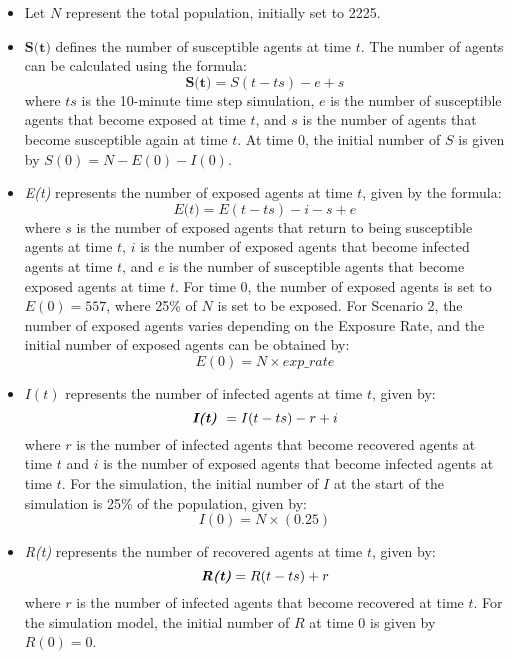  \begin{itemize}     
 	\item Let \( N \) represent the total population, initially set to 2225.
 	
 	\item \( \textbf{S(t)} \) defines the number of susceptible agents at time \( t \). The number of agents can be calculated using the formula:
 	\[ \textbf{S(t)} = S(t-ts) - e + s \]
 	where \( ts \) is the 10-minute time step simulation, \( e \) is the number of susceptible agents that become exposed at time \( t \), and \( s \) is the number of agents that become susceptible again at time \( t \). At time 0, the initial number of \( S \) is given by \( S(0) = N - E(0) - I(0) \).
 	
 	\item \textit{E(t)} represents the number of exposed agents at time \( t \), given by the formula:
 	\[ \textit{E(t)} = E(t - ts) - i - s + e \]
 	where \( s \) is the number of exposed agents that return to being susceptible agents at time \( t \), \( i \) is the number of exposed agents that become infected agents at time \( t \), and \( e \) is the number of susceptible agents that become exposed agents at time \( t \). For time 0, the number of exposed agents is set to \( E(0) = 557 \), where 25\% of \( N \) is set to be exposed. For Scenario 2, the number of exposed agents varies depending on the Exposure Rate, and the initial number of exposed agents can be obtained by:
 	\[ E(0) = N \times exp\_rate \]
 	
 	\item \( I(t) \) represents the number of infected agents at time \( t \), given by:
 	\[ \textbf{\textit{I(t)} }= I(t - ts) - r + i \]
 	where \( r \) is the number of infected agents that become recovered agents at time \( t \) and \( i \) is the number of exposed agents that become infected agents at time \( t \).  For the simulation, the initial number of \( I \) at the start of the simulation is 25\% of the population, given by:
 	\[ I(0) = N \times (0.25) \]
 	
 	\item \textit{R(t)} represents the number of recovered agents at time \( t \), given by:
 	\[ \textbf{\textit{R(t)}} = R(t - ts) + r \]
 	where \( r \) is the number of infected agents that become recovered at time \( t \). For the simulation model, the initial number of \( R \) at time 0 is given by \( R(0) = 0 \).
 	

\end{itemize}
